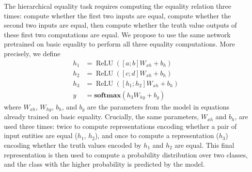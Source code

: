 \documentclass[9pt,twocolumn,twoside,lineno]{pnas-new}
\newcommand{\softmax}{\mathbf{softmax}}
\DeclareMathOperator{\ReLU}{ReLU}
\begin{document}
The hierarchical equality task requires computing the equality relation three times: compute whether the first two inputs are equal, compute whether the second two inputs are equal, then compute whether the truth value outputs of these first two computations are equal. We propose to use the same network pretrained on basic equality to perform all three equality computations.  More precisely, we define
%
\begin{align}
  h_1 &= \ReLU([a;b]W_{xh} + b_{h})\\
  h_2 &= \ReLU([c;d]W_{xh} + b_{h})\\
  h_3 &= \ReLU([h_1;h_2]W_{xh} + b_{h}) \\
  y &= \softmax(h_3W_{hy} + b_{y})
\end{align}
%
where $W_{xh}$, $W_{hy}$, $b_h$, and $b_y$ are the parameters from the model in equations  already trained on basic equality.  Crucially, the same parameters, $W_{xh}$ and $b_h$, are used three times: twice to compute representations encoding whether a pair of input entities are equal ($h_1$, $h_2$), and once to compute a representation ($h_{3}$) encoding whether the truth values encoded by $h_1$ and $h_2$ are equal. This final representation is then used to compute a probability distribution over two classes, and the class with the higher probability is predicted by the model.
\end{document}

